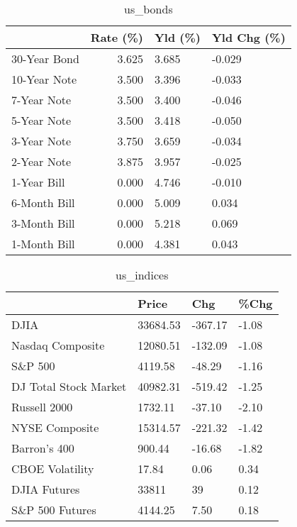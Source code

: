\documentclass{article}%
\begin{document}
%


\begin{table}[htbp]%
\caption{us\_bonds}%
\centering%
\begin{adjustbox}{width=1\textwidth}%
\begin{tabular}{lrll}
\toprule
             &  Rate (\%) & Yld (\%) & Yld Chg (\%) \\
\midrule
30-Year Bond &     3.625 &   3.685 &      -0.029 \\
10-Year Note &     3.500 &   3.396 &      -0.033 \\
 7-Year Note &     3.500 &   3.400 &      -0.046 \\
 5-Year Note &     3.500 &   3.418 &      -0.050 \\
 3-Year Note &     3.750 &   3.659 &      -0.034 \\
 2-Year Note &     3.875 &   3.957 &      -0.025 \\
 1-Year Bill &     0.000 &   4.746 &      -0.010 \\
6-Month Bill &     0.000 &   5.009 &       0.034 \\
3-Month Bill &     0.000 &   5.218 &       0.069 \\
1-Month Bill &     0.000 &   4.381 &       0.043 \\
\bottomrule
\end{tabular}
%
\end{adjustbox}%
\end{table}

%


\begin{table}[htbp]%
\caption{us\_indices}%
\centering%
\begin{adjustbox}{width=1\textwidth}%
\begin{tabular}{llll}
\toprule
                      &    Price &     Chg &  \%Chg \\
\midrule
                 DJIA & 33684.53 & -367.17 & -1.08 \\
     Nasdaq Composite & 12080.51 & -132.09 & -1.08 \\
              S\&P 500 &  4119.58 &  -48.29 & -1.16 \\
DJ Total Stock Market & 40982.31 & -519.42 & -1.25 \\
         Russell 2000 &  1732.11 &  -37.10 & -2.10 \\
       NYSE Composite & 15314.57 & -221.32 & -1.42 \\
         Barron's 400 &   900.44 &  -16.68 & -1.82 \\
      CBOE Volatility &    17.84 &    0.06 &  0.34 \\
         DJIA Futures &    33811 &      39 &  0.12 \\
      S\&P 500 Futures &  4144.25 &    7.50 &  0.18 \\
\bottomrule
\end{tabular}
%
\end{adjustbox}%
\end{table}
\end{document}
